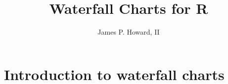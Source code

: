 \documentclass[]{article}
\author{James P. Howard, II}
\title{Waterfall Charts for R}
\begin{document}
\maketitle

\section[Introduction to waterfall charts]{Introduction to waterfall charts}
\end{document}
